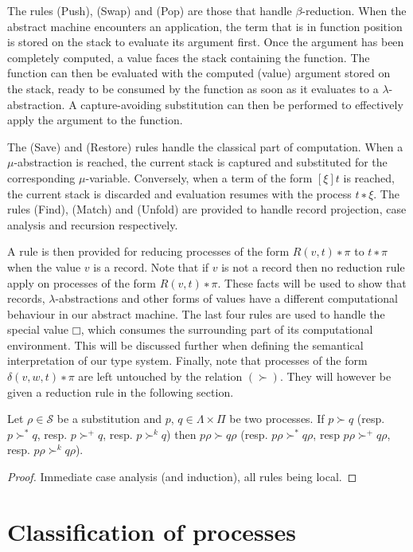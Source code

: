 The rules (Push), (Swap) and (Pop) are those that handle $β$-reduction. When
the abstract machine encounters an application, the term that is in function
position is stored on the stack to evaluate its argument first. Once the
argument has been completely computed, a value faces the stack containing the
function. The function can then be evaluated with the computed (value)
argument stored on the stack, ready to be consumed by the function as soon as
it evaluates to a $λ$-abstraction. A capture-avoiding substitution can then be
performed to effectively apply the argument to the function.

The (Save) and (Restore) rules handle the classical part of computation. When
a $μ$-abstraction is reached, the current stack is captured and substituted
for the corresponding $μ$-variable. Conversely, when a term of the form $[ξ]t$
is reached, the current stack is discarded and evaluation resumes with the
process $t ∗ ξ$. The rules (Find), (Match) and (Unfold) are provided to handle
record projection, case analysis and recursion respectively.

A rule is then provided for reducing processes of the form $R(v,t) ∗ π$ to
$t ∗ π$ when the value $v$ is a record. Note that if $v$ is not a record then
no reduction rule apply on processes of the form $R(v,t) ∗ π$. These facts
will be used to show that records, $λ$-abstractions and other forms of
values have a different computational behaviour in our abstract machine.
The last four rules are used to handle the special value $□$, which consumes
the surrounding part of its computational environment. This will be discussed
further when defining the semantical interpretation of our type system.
%
Finally, note that processes of the form $δ(v,w,t) ∗ π$ are left untouched
by the relation $(≻)$. They will however be given a reduction rule in the
following section.

\begin{theorem}\label{thm:redcompatall}%
  Let $ρ ∈ \mathcal{S}$ be a substitution and $p$, $q ∈ Λ×Π$ be two processes.
  If $p ≻ q$ (resp. $p ≻^{*} q$, resp. $p ≻^{+} q$, resp. $p ≻^k q$) then
  $pρ ≻ qρ$ (resp. $pρ ≻^{*} qρ$, resp $pρ ≻^{+} qρ$, resp. $pρ ≻^k qρ$).
\end{theorem}
\begin{proof}
  Immediate case analysis (and induction), all rules being local.
\end{proof}

\section{Classification of processes}


